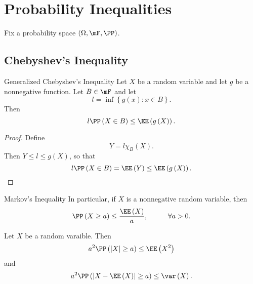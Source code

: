 \documentclass[stat901]{subfiles}
\begin{document}
    \section{Probability Inequalities}

    Fix a probability space $\left( \Omega,\mF,\PP \right)$.
    
    \subsection{Chebyshev's Inequality}

    \begin{theorem}{Generalized Chebyshev's Inequality}
        Let $X$ be a random variable and let $g$ be a nonnegative function. Let $B\in\mF$ and let
        \begin{equation*}
            l = \inf\left\lbrace g\left( x \right):x\in B \right\rbrace.
        \end{equation*}
        Then
        \begin{equation*}
            l\PP\left( X\in B \right) \leq \EE\left( g\left( X \right) \right).
        \end{equation*}
    \end{theorem}
    
    \begin{proof}
        Define
        \begin{equation*}
            Y = l\chi_B\left( X \right).
        \end{equation*}
        Then $Y\leq l\leq g\left( X \right)$, so that
        \begin{equation*}
            l\PP\left( X\in B \right) = \EE\left( Y \right) \leq \EE\left( g\left( X \right) \right).
        \end{equation*}
    \end{proof}
    
    \begin{cor}{Markov's Inequality}
        In particular, if $X$ is a nonnegative random variable, then
        \begin{equation*}
            \PP\left( X\geq a \right)\leq \frac{\EE\left( X \right)}{a}, \hspace{1cm}\forall a>0.
        \end{equation*}
    \end{cor}	
    
    \rruleline
    
    \begin{cor}{}
        Let $X$ be a random varaible. Then
        \begin{equation*}
            a^{2}\PP\left( \left| X \right|\geq a \right)\leq \EE\left( X^{2} \right)
        \end{equation*}
        and
        \begin{equation*}
            a^{2}\PP\left( \left| X-\EE\left( X \right) \right|\geq a \right)\leq\var\left( X \right).
        \end{equation*}
    \end{cor}	
\end{document}
